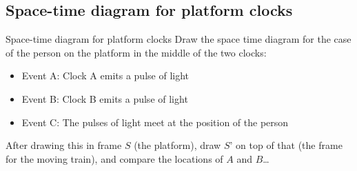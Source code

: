 \documentclass[aspectratio=169,
hyperref={colorlinks,urlcolor=blue}
]{beamer}
\begin{document}
\subsection{Space-time diagram for platform clocks}
\label{subsec:spcaetimediagramforplatformclocks}
\begin{frame}{Space-time diagram for platform clocks}
Draw the space time diagram for the case of the person on the platform in the middle of the two clocks:
\begin{itemize}
\item Event A: Clock A emits a pulse of light
\item Event B: Clock B emits a pulse of light
\item Event C: The pulses of light meet at the position of the person
\end{itemize}
After drawing this in frame $S$ (the platform), draw $S’$ on top of that (the frame for the moving train), and compare the locations of $A$ and $B$…
\end{frame}
\end{document}
